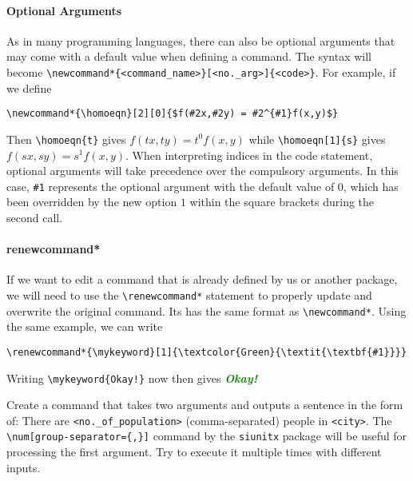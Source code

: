 \paragraph{Optional Arguments}
As in many programming languages, there can also be optional arguments that may come with a default value when defining a command. The syntax will become \texttt{\textbackslash newcommand*\{<command\_name>\}[<no.\_arg>]\{<code>\}}. For example, if we define 
\begin{lstlisting}
\newcommand*{\homoeqn}[2][0]{$f(#2x,#2y) = #2^{#1}f(x,y)$}    
\end{lstlisting}
\newcommand*{\homoeqn}[2][0]{$f(#2x,#2y) = #2^{#1}f(x,y)$}
Then \texttt{\textbackslash homoeqn\{t\}} gives \homoeqn{t} while \texttt{\textbackslash homoeqn[1]\{s\}} gives \homoeqn[1]{s}. When interpreting indices in the code statement, optional arguments will take precedence over the compulsory arguments. In this case, \texttt{\#1} represents the optional argument with the default value of $0$, which has been overridden by the new option $1$ within the square brackets during the second call.

\paragraph{renewcommand*}
If we want to edit a command that is already defined by us or another package, we will need to use the \texttt{\textbackslash renewcommand*} statement to properly update and overwrite the original command. Its has the same format as \texttt{\textbackslash newcommand*}. Using the same example, we can write
\begin{lstlisting}
\renewcommand*{\mykeyword}[1]{\textcolor{Green}{\textit{\textbf{#1}}}}    
\end{lstlisting}
\renewcommand*{\mykeyword}[1]{\textcolor{Green}{\textit{\textbf{#1}}}}
Writing \texttt{\textbackslash mykeyword\{Okay!\}} now then gives \mykeyword{Okay!}

\begin{exercisebox}
\begin{Exercise}
Create a command that takes two arguments and outputs a sentence in the form of:
There are \texttt{<no.\_of\_population>} (comma-separated) people in \texttt{<city>}. The \texttt{\textbackslash num[group-separator=\{,\}]} command by the \texttt{siunitx} package will be useful for processing the first argument. Try to execute it multiple times with different inputs.
\end{Exercise}
\end{exercisebox}

